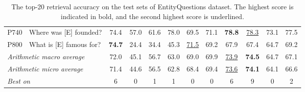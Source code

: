 \documentclass[letterpaper]{article} %
\begin{document}
\begin{table}
{\begin{tabular}{llcccccccccc}
			P740                                                  & Where was [E] founded?                  & 74.4             & 57.0            & 61.6               & 78.0             & 69.5                         & 71.1                        & \textbf{78.8}      & \underline{78.3}  & 73.1                & 77.5                     \\
			P800                                                  & What is [E] famous for?                 & \textbf{74.7}    & 24.4            & 34.4               & 45.3             & \underline{71.5}             & 69.2                        & 67.9               & 67.4              & 64.7                & 69.2                     \\

			\midrule
			\multicolumn{2}{l}{\textit{Arithmetic macro average}} & 72.0                                    & 45.1             & 56.7            & 63.0               & 69.0             & 69.9                         & \underline{73.9}            & \textbf{74.5}      & 64.7              & 67.1                                           \\
			\multicolumn{2}{l}{\textit{Arithmetic micro average}} & 71.4                                    & 44.6             & 56.5            & 62.8               & 68.4             & 69.4                         & \underline{73.6}            & \textbf{74.1}      & 64.1              & 66.6                                           \\
			\multicolumn{2}{l}{\textit{Best on}}                  & 6                                       & 0                & 1               & 1                  & 0                & 0                            & 6                           & 9                  & 0                 & 2                                              \\
			\bottomrule
		\end{tabular}
	}
	\caption{
		The top-20 retrieval accuracy on the test sets of EntityQuestions dataset. The highest score is indicated in bold, and the second highest score is underlined.
	}
	\label{tab:resutls_eq}
\end{table}
\end{document}
